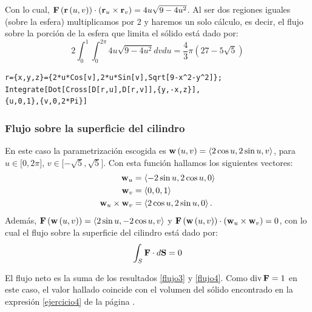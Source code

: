 \begin{parrafonumerado}
Con lo cual, {\small ${\bf F}\left({\bf r}\left(u,v\right)\right) \cdot \left({\bf r}_{u}\times {\bf r}_{v}\right)= 4u\sqrt{9-4u^{2}}$.}
Al ser dos regiones iguales (sobre la esfera) multiplicamos por 2 y haremos un solo cálculo, es decir, el flujo sobre la porción de la esfera que limita el sólido está dado por:
\begin{equation}\label{flujo3}
2\int_{0}^{1}\int_{0}^{2\pi }4u\sqrt{9-4u^{2}}dvdu= \frac{4}{3}\pi \left( 27-5\sqrt{5}\right)
\end{equation}


\begin{tcolorbox}[title=\bf Instrucción \verb"Mathematica"]\begin{Verbatim}[formatcom=\letraverbatim]
r={x,y,z}={2*u*Cos[v],2*u*Sin[v],Sqrt[9-x^2-y^2]};
Integrate[Dot[Cross[D[r,u],D[r,v]],{y,-x,z}],
{u,0,1},{v,0,2*Pi}]
\end{Verbatim}
\end{tcolorbox}

\clearpage

\subsubsection{Flujo sobre la superficie del cilindro}

En este caso la parametrización escogida es
${\bf w}\left( u,v\right) =\left\langle 2\cos u,2\sin u,v\right\rangle $, para $ u\in \lbrack 0,2\pi ]$, $v\in \lbrack -\sqrt{5},\sqrt{5}]$.
Con esta función hallamos los siguientes vectores:
\[
\begin{aligned}
{\bf w}_{u}&=\left\langle -2\sin u,2\cos u,0\right\rangle \\
{\bf w}_{v}&=\left\langle 0,0,1\right\rangle \\
{\bf w}_{u}\times {\bf w}_{v}&=\left\langle 2\cos u,2\sin u,0\right\rangle.
\end{aligned}
\]
Además, ${\bf F}\left( {\bf w}\left( u,v\right) \right) =\left\langle 2\sin u,-2\cos u,v\right\rangle $ y ${\bf F}\left({\bf w}\left( u,v\right) \right) \cdot \left({\bf w}_{u}\times {\bf w}_{v}\right)= 0$, con lo cual el flujo sobre la superficie del cilindro está dado por:
\begin{equation}\label{flujo4}
\int_S {\bf F}\cdot d{\bf S}=0
\end{equation}

El flujo neto es la suma de los resultados \ref{flujo3} y \ref{flujo4}. Como ${\rm div}\,{\bf F}=1$ en este caso, el valor hallado coincide con el volumen del sólido encontrado en la expresión \ref{ejercicio4} de la página \pageref{ejercicio4}.


\end{parrafonumerado}
